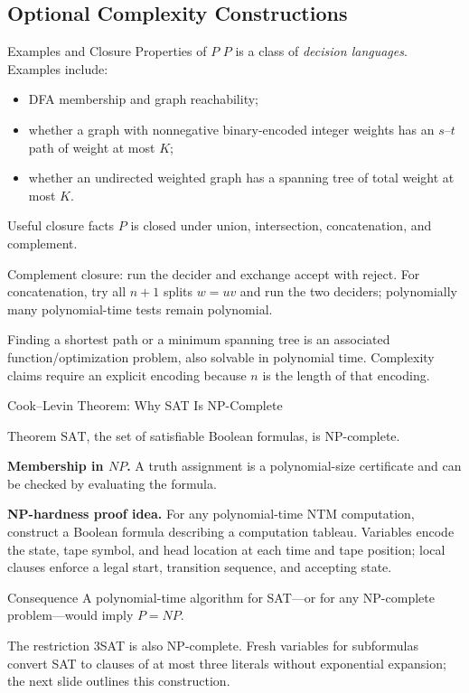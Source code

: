 \documentclass[10pt]{beamer}
\begin{document}
\subsection{Optional Complexity Constructions}

\begin{frame}{Examples and Closure Properties of $P$}
  \small
  $P$ is a class of \emph{decision languages}. Examples include:
  \begin{itemize}
    \item DFA membership and graph reachability;
    \item whether a graph with nonnegative binary-encoded integer weights
      has an $s$--$t$ path of weight at most $K$;
    \item whether an undirected weighted graph has a spanning tree of
      total weight at most $K$.
  \end{itemize}
  \begin{block}{Useful closure facts}
    $P$ is closed under union, intersection, concatenation, and complement.
  \end{block}
  Complement closure: run the decider and exchange accept with reject.
  For concatenation, try all $n+1$ splits $w=uv$ and run the two deciders;
  polynomially many polynomial-time tests remain polynomial.
  \par\smallskip
  Finding a shortest path or a minimum spanning tree is an associated
  function/optimization problem, also solvable in polynomial time.
  Complexity claims require an explicit encoding because $n$ is the length of that encoding.
\end{frame}

\begin{frame}{Cook--Levin Theorem: Why SAT Is NP-Complete}
  \begin{block}{Theorem}
    $\mathrm{SAT}$, the set of satisfiable Boolean formulas, is NP-complete.
  \end{block}
  \textbf{Membership in $NP$.} A truth assignment is a polynomial-size certificate and can be checked
  by evaluating the formula.

  \textbf{NP-hardness proof idea.} For any polynomial-time NTM computation, construct a Boolean
  formula describing a computation tableau. Variables encode the state, tape symbol, and head
  location at each time and tape position; local clauses enforce a legal start, transition sequence,
  and accepting state.
  \begin{alertblock}{Consequence}
    A polynomial-time algorithm for SAT---or for any NP-complete problem---would imply $P=NP$.
  \end{alertblock}
  The restriction 3SAT is also NP-complete. Fresh variables for subformulas
  convert SAT to clauses of at most three literals without exponential
  expansion; the next slide outlines this construction.
\end{frame}
\end{document}
